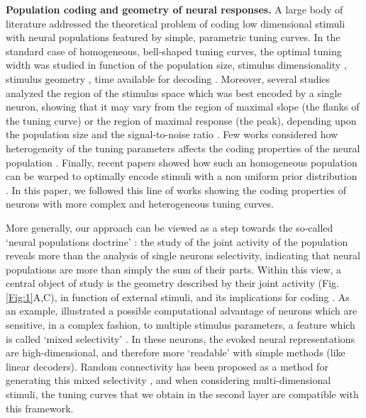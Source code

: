 \documentclass[a4paper]{article}%
\begin{document}
\textbf{Population coding and geometry of neural responses.}  A large body of literature addressed the theoretical problem of coding low dimensional stimuli with neural populations featured by simple, parametric tuning curves. In the standard case of homogeneous, bell-shaped tuning curves, the optimal tuning width was studied in function of the population size, stimulus dimensionality \cite[]{Zhang1999NeuronalBroaden}, stimulus geometry \cite[]{Montemurro2006OptimalVariables}, time available for decoding \cite[]{Bethge2002OptimalFails,Yaeli2010Error-basedNeurons}. Moreover, several studies analyzed the region of the stimulus space which was best encoded by a single neuron, showing that it may vary from the region of maximal slope (the flanks of the tuning curve) or the region of maximal response (the peak), depending upon the population size and the signal-to-noise ratio \cite[]{Butts2006TuningCoding,Yarrow2015TheCurves}.
Few works considered how heterogeneity of the tuning parameters affects the coding properties of the neural population
\cite[]{Wilke2002RepresentationalPopulations,Shamir2006ImplicationsCoding,Fiscella2015VisualNeurons}.  Finally, recent papers showed how such an homogeneous population can be warped to optimally encode stimuli with a non uniform prior distribution \cite[]{Wei2012EfficientInference,Ganguli2014EfficientPopulations,Yerxa2020EfficientStimuli}.
In this paper, we followed this line of works showing the coding
properties of neurons with more complex and heterogeneous tuning curves. 

More
generally, our approach can be viewed as a step towards the so-called `neural
populations doctrine' \cite[]{Saxena2019TowardsDoctrine}: the study of the joint
activity of the population reveals more than the analysis of single neurons
selectivity, indicating that neural populations are more than simply the sum
of their parts. Within this view, a central object of study is the geometry
described by their joint activity (Fig. \ref{Fig:1}A,C), in function of
external stimuli, and its implications for coding
\cite[]{Stringer2019High-dimensionalCortex,Kobak2019State-dependentCortex}. As an example,
\cite{Fusi2016WhyCognition} illustrated a possible computational advantage of
neurons which are sensitive, in a complex fashion, to multiple stimulus
parameters, a feature which is called `mixed selectivity'
\cite[]{Rigotti2013TheTasks}. In these neurons, the evoked neural
representations are high-dimensional, and therefore more `readable' with
simple methods (like linear decoders). Random connectivity has been proposed
as a method for generating this mixed selectivity
\cite[]{Barak2013FromDiscrimination,Lindsay2017HebbianCortex}, and when
considering multi-dimensional stimuli, the tuning curves that we obtain in the
second layer are compatible with this framework.
\end{document}
